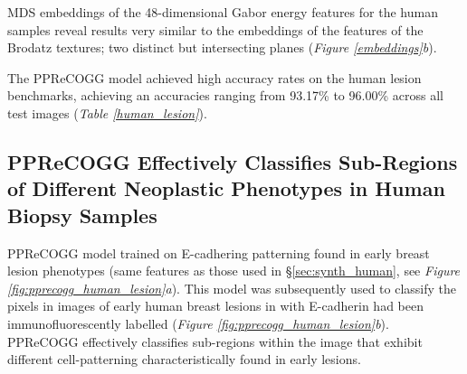 MDS embeddings of the 48-dimensional Gabor energy features for the human samples reveal results very similar to the embeddings of the features of the Brodatz textures; two distinct but intersecting planes (\textit{Figure \ref{embeddings}b}).\par

The PPReCOGG model achieved high accuracy rates on the human lesion benchmarks, achieving an accuracies ranging from 93.17\% to 96.00\% across all test images (\textit{Table \ref{human_lesion}}).\par



\subsection{PPReCOGG Effectively Classifies Sub-Regions of Different Neoplastic Phenotypes in Human Biopsy Samples}

PPReCOGG model trained on E-cadhering patterning found in early breast lesion phenotypes (same features as those used in \S\ref{sec:synth_human}, see \textit{Figure \ref{fig:pprecogg_human_lesion}a}). This model was subsequently used to classify the pixels in images of early human breast lesions in with \mbox{E-cadherin} had been immunofluorescently labelled (\textit{Figure \ref{fig:pprecogg_human_lesion}b}). PPReCOGG effectively classifies sub-regions within the image that exhibit different cell-patterning characteristically found in early lesions.\par

